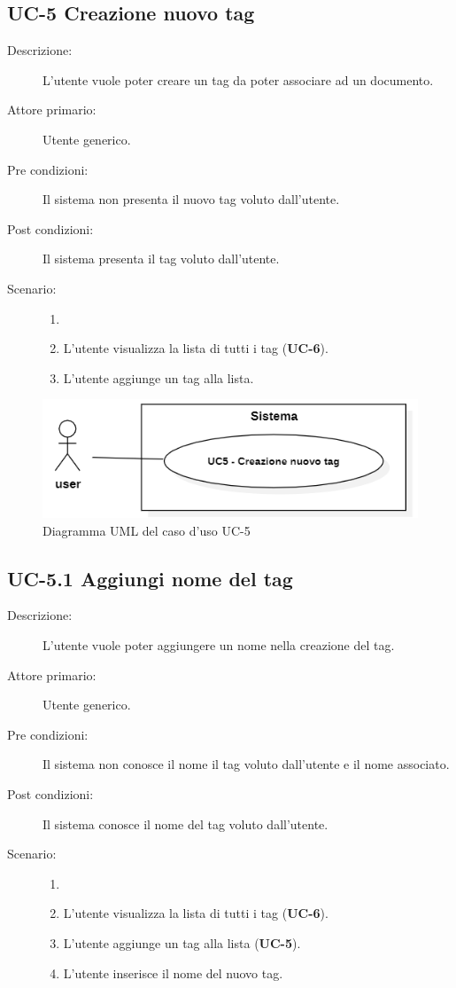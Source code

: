 \subsection{UC-5 Creazione nuovo tag}
\begin{description}
    \item[Descrizione:] L’utente vuole poter creare un tag da poter associare ad un documento.
    \item[Attore primario:] Utente generico.
    \item[Pre condizioni:] Il sistema non presenta il nuovo tag voluto dall’utente.
    \item[Post condizioni:] Il sistema presenta il tag voluto dall’utente.
    \item[Scenario:]
    \begin{enumerate}
        \item[]
        \item L’utente visualizza la lista di tutti i tag (\textbf{UC-6}).
        \item L'utente aggiunge un tag alla lista.
    \end{enumerate}
\end{description}

\begin{figure}[H]
    \centering
    \includegraphics[width=0.8\linewidth]{UC5.png} %
    \caption{Diagramma UML del caso d'uso UC-5}
    \label{fig:UC7}
\end{figure}

\subsection{UC-5.1 Aggiungi nome del tag}
\begin{description}
    \item[Descrizione:] L’utente vuole poter aggiungere un nome nella creazione del tag.
    \item[Attore primario:] Utente generico.
    \item[Pre condizioni:] Il sistema non conosce il nome  il tag voluto dall’utente e il nome associato.
    \item[Post condizioni:] Il sistema conosce il nome del tag voluto dall’utente.
    \item[Scenario:]
    \begin{enumerate}
        \item[]
        \item L’utente visualizza la lista di tutti i tag (\textbf{UC-6}).
        \item L'utente aggiunge un tag alla lista (\textbf{UC-5}).
        \item L'utente inserisce il nome del nuovo tag.
    \end{enumerate}
\end{description}

